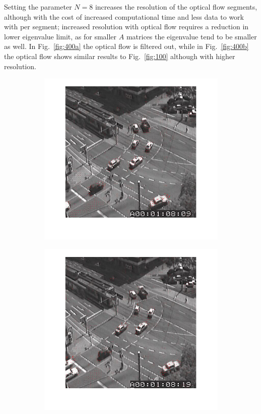 \documentclass[a4paper]{iacas}
\begin{document}
Setting the parameter $N=8$ increases the resolution of the optical flow segments, although with the cost of increased computational time and less data to work with per segment; increased resolution with optical flow requires a reduction in lower eigenvalue limit, as for smaller $A$ matrices the eigenvalue tend to be smaller as well. In Fig.~\ref{fig:400a} the optical flow is filtered out, while in Fig.~\ref{fig:400b} the optical flow shows similar results to Fig.~\ref{fig:100} although with higher resolution.

\begin{figure}[!htbp]
	\centering
	\begin{subfigure}[b]{0.4\textwidth}
		\includegraphics[width=\textwidth]{402.jpg}
		\caption{}
		\label{fig:402}
	\end{subfigure}
	\begin{subfigure}[b]{0.4\textwidth}
		\includegraphics[width=\textwidth]{403.jpg}
		\caption{}
		\label{fig:403}
	\end{subfigure}
	

\end{figure}
\end{document}
